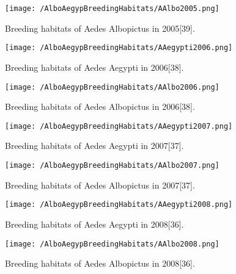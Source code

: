 \documentclass[11pt]{exam}
\begin{document}
\begin{questions}
\begin{enumerate}
\begin{figure}[H]
  \centering
   \texttt{[image: /AlboAegypBreedingHabitats/AAlbo2005.png]} 
  \caption{Breeding habitats of Aedes Albopictus in 2005[39].}
   \label{Breeding habitats of Aedes mosquitoes}
\end{figure} 

\newpage
\begin{figure}[H]
  \centering
   \texttt{[image: /AlboAegypBreedingHabitats/AAegypti2006.png]} 
  \caption{Breeding habitats of Aedes Aegypti in 2006[38].}
   \label{Breeding habitats of Aedes mosquitoes}
\end{figure} 

\begin{figure}[H]
  \centering
   \texttt{[image: /AlboAegypBreedingHabitats/AAlbo2006.png]} 
  \caption{Breeding habitats of Aedes Albopictus in 2006[38].}
   \label{Breeding habitats of Aedes mosquitoes}
\end{figure} 

\newpage
\begin{figure}[H]
  \centering
   \texttt{[image: /AlboAegypBreedingHabitats/AAegypti2007.png]} 
  \caption{Breeding habitats of Aedes Aegypti in 2007[37].}
   \label{Breeding habitats of Aedes mosquitoes}
\end{figure} 

\begin{figure}[H]
  \centering
   \texttt{[image: /AlboAegypBreedingHabitats/AAlbo2007.png]} 
  \caption{Breeding habitats of Aedes Albopictus in 2007[37].}
   \label{Breeding habitats of Aedes mosquitoes}
\end{figure} 

\newpage
\begin{figure}[H]
  \centering
   \texttt{[image: /AlboAegypBreedingHabitats/AAegypti2008.png]} 
  \caption{Breeding habitats of Aedes Aegypti in 2008[36].}
   \label{Breeding habitats of Aedes mosquitoes}
\end{figure} 

\begin{figure}[H]
  \centering
   \texttt{[image: /AlboAegypBreedingHabitats/AAlbo2008.png]} 
  \caption{Breeding habitats of Aedes Albopictus in 2008[36].}
   \label{Breeding habitats of Aedes mosquitoes}
\end{figure} 


\end{enumerate}
\end{questions}
\end{document}
